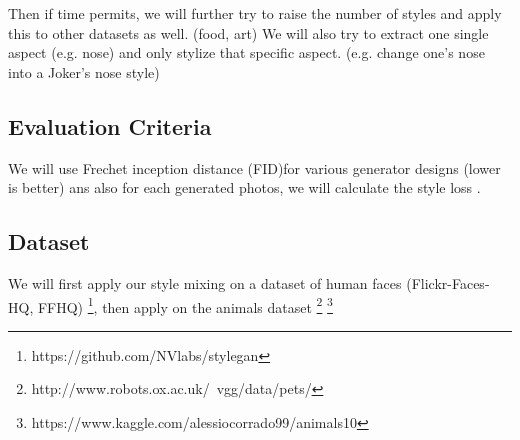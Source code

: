 \documentclass{article}
\begin{document}
Then if time permits, we will further try to raise the number of styles and apply this to other datasets as well. (food, art) We will also try to extract one single aspect (e.g. nose) and only stylize that specific aspect. (e.g. change one's nose into a Joker's nose style)

\subsection{Evaluation Criteria}

We will use Frechet inception distance (FID)\cite{fid}for various generator designs (lower is better) ans also for each generated photos, we will calculate the style loss \cite{styletransferog}. 

\subsection{Dataset}

We will first apply our style mixing on a dataset of human faces (Flickr-Faces-HQ, FFHQ) \footnote{ https://github.com/NVlabs/stylegan}, then apply on the animals dataset \footnote{http://www.robots.ox.ac.uk/~vgg/data/pets/} \footnote{https://www.kaggle.com/alessiocorrado99/animals10}


\nocite{langley00}








\end{document}
